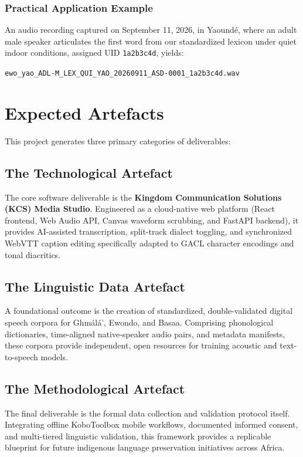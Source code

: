 \documentclass[a4paper,11pt]{article}
\begin{document}
\subsubsection*{Practical Application Example}
An audio recording captured on September 11, 2026, in Yaound\'e, where an adult male speaker articulates the first word from our standardized lexicon under quiet indoor conditions, assigned UID \texttt{1a2b3c4d}, yields:
\begin{center}
\texttt{ewo\_yao\_ADL-M\_LEX\_QUI\_YAO\_20260911\_ASD-0001\_1a2b3c4d.wav}
\end{center}

\section{Expected Artefacts}
\label{sec:artefacts}

This project generates three primary categories of deliverables:

\subsection{The Technological Artefact}
The core software deliverable is the \textbf{Kingdom Communication Solutions (KCS) Media Studio}. Engineered as a cloud-native web platform (React frontend, Web Audio API, Canvas waveform scrubbing, and FastAPI backend), it provides AI-assisted transcription, split-track dialect toggling, and synchronized WebVTT caption editing specifically adapted to GACL character encodings and tonal diacritics.

\subsection{The Linguistic Data Artefact}
A foundational outcome is the creation of standardized, double-validated digital speech corpora for Gh\textopeno m\'al\'a', Ewondo, and Basaa. Comprising phonological dictionaries, time-aligned native-speaker audio pairs, and metadata manifests, these corpora provide independent, open resources for training acoustic and text-to-speech models.

\subsection{The Methodological Artefact}
The final deliverable is the formal data collection and validation protocol itself. Integrating offline KoboToolbox mobile workflows, documented informed consent, and multi-tiered linguistic validation, this framework provides a replicable blueprint for future indigenous language preservation initiatives across Africa.
\end{document}
